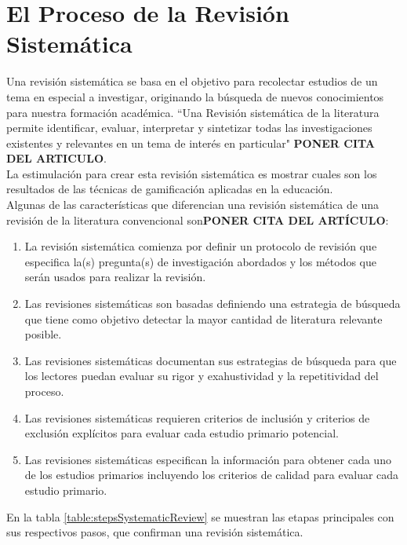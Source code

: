 \documentclass[fleqn,10pt]{SelfArx} %
\begin{document}
\section{El Proceso de la Revisión Sistemática}
Una revisión sistemática se basa en el objetivo para recolectar estudios de un tema en especial a investigar, originando la búsqueda de nuevos conocimientos para nuestra formación académica. ``Una Revisión sistemática de la literatura permite identificar, evaluar, interpretar y sintetizar todas las investigaciones existentes y relevantes en un tema de interés en particular" \textbf{PONER CITA DEL ARTICULO}.\\
La estimulación para crear esta revisión sistemática es mostrar cuales son los resultados de las técnicas de gamificación aplicadas en la educación.\\
Algunas de las características que diferencian una revisión sistemática de una revisión de la literatura convencional son\textbf{PONER CITA DEL ARTÍCULO}:
\begin{enumerate}
	\item La revisión sistemática comienza por definir un protocolo de revisión que especifica la(s) pregunta(s) de investigación abordados y los métodos que serán usados para realizar la revisión.
	\item Las revisiones sistemáticas son basadas definiendo una estrategia de búsqueda que tiene como objetivo detectar la mayor cantidad de literatura relevante posible.
	\item Las revisiones sistemáticas documentan sus estrategias de búsqueda para que los lectores puedan evaluar su rigor y exahustividad y la repetitividad del proceso.
	\item Las revisiones sistemáticas requieren criterios de inclusión y criterios de exclusión explícitos para evaluar cada estudio primario potencial.
	\item Las revisiones sistemáticas especifican la información para obtener cada uno de los estudios primarios incluyendo los criterios de calidad para evaluar cada estudio primario.
\end{enumerate}
En la tabla \ref{table:stepsSystematicReview} se muestran las etapas principales con sus respectivos pasos, que confirman una revisión sistemática.
\end{document}
